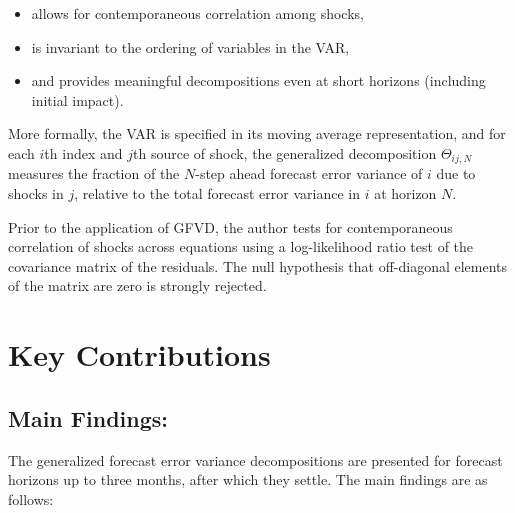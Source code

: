 \documentclass{article}
\begin{document}
\begin{itemize}
    \item allows for contemporaneous correlation among shocks,
    \item is invariant to the ordering of variables in the VAR,
    \item and provides meaningful decompositions even at short horizons (including initial impact).
\end{itemize}

\noindent More formally, the VAR is specified in its moving average representation, and for each $i$th index and $j$th source of shock, the generalized decomposition $\Theta_{ij,N}$ measures the fraction of the $N$-step ahead forecast error variance of $i$ due to shocks in $j$, relative to the total forecast error variance in $i$ at horizon $N$.

\hfill

\noindent Prior to the application of GFVD, the author tests for contemporaneous correlation of shocks across equations using a log-likelihood ratio test of the covariance matrix of the residuals. The null hypothesis that off-diagonal elements of the matrix are zero is strongly rejected.

\hfill

\section{Key Contributions}

\subsection{Main Findings:}  
The generalized forecast error variance decompositions are presented for forecast horizons up to three months, after which they settle. The main findings are as follows:
\end{document}
